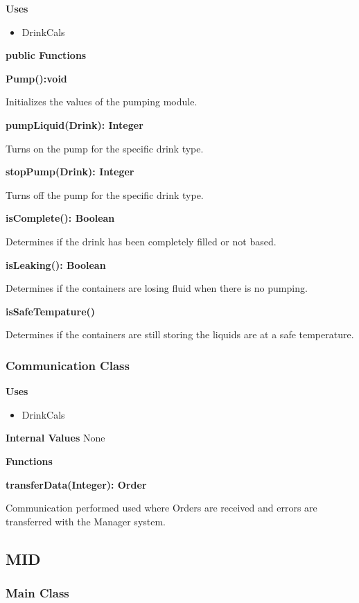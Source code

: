 \documentclass [10pt]{article}
\begin{document}
\textbf{Uses}

\begin{itemize}
	\item DrinkCals
\end{itemize}


\textbf{public Functions}

\textbf{Pump():void}

Initializes the values of the pumping module.

\textbf{pumpLiquid(Drink): Integer}

Turns on the pump for the specific drink type.

\textbf{stopPump(Drink): Integer}

Turns off the pump for the specific drink type.

\textbf{isComplete(): Boolean}

Determines if the drink has been completely filled or not based.

\textbf{isLeaking(): Boolean}

Determines if the containers are losing fluid when there is no pumping.

\textbf{isSafeTempature()}

Determines if the containers are still storing the liquids are at a safe temperature.

\subsubsection{Communication Class}

\textbf{Uses}

\begin{itemize}
	\item DrinkCals
\end{itemize}

\textbf{Internal Values}
None

\textbf{Functions}

\textbf{transferData(Integer): Order}

Communication performed used  where Orders are received and errors are transferred with the Manager system.


\subsection{MID}

\subsubsection{Main Class}
\end{document}
